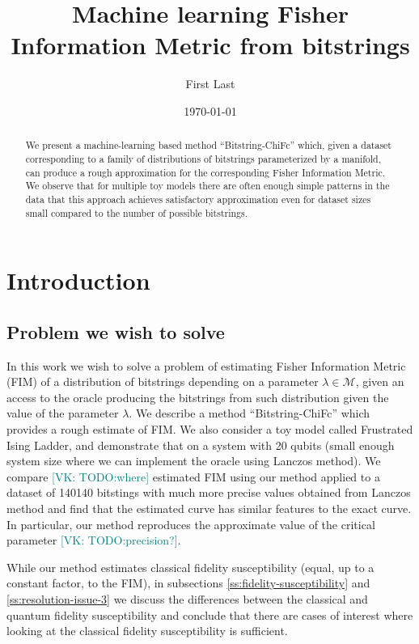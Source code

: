 \documentclass[
  american,aps,pra,reprint,floatfix,nofootinbib,superscriptaddress
]{revtex4-2}
\newcommand{\VK}[1]{\textcolor{teal}{[VK: #1]}}
\begin{document}
\title{Machine learning Fisher Information Metric from bitstrings}
\author{First Last}

\date{\today}

\begin{abstract}
We present a machine-learning based method ``Bitstring-ChiFc'' which,
given a dataset corresponding to a family of distributions of bitstrings
parameterized by a manifold, can produce a rough approximation
for the corresponding Fisher Information Metric.
We observe that for multiple toy models there are often enough simple patterns
in the data that this approach
achieves satisfactory approximation even for dataset sizes small
compared to the number of possible bitstrings.
\end{abstract}

\maketitle

\section{Introduction}
\subsection{Problem we wish to solve}
In this work we wish to solve a problem of estimating Fisher Information Metric
(FIM) of a distribution of bitstrings depending on a parameter
$\lambda \in \mathcal{M}$, given an access to the oracle producing the
bitstrings from such distribution given the value of the parameter $\lambda$.
We describe a method ``Bitstring-ChiFc'' which provides a rough estimate of FIM.
We also consider a toy model called Frustrated Ising Ladder, and demonstrate
that on a system with 20 qubits (small enough system size where we can
implement the oracle using Lanczos method).
We compare \VK{TODO:where} estimated FIM using our method applied to a dataset
of 140140 bitstings with much more precise values obtained from
Lanczos method and find that the estimated curve has similar features
to the exact curve. In particular, our method reproduces the approximate value
of the critical parameter \VK{TODO:precision?}.

While our method estimates classical fidelity susceptibility (equal, up to
a constant factor, to the FIM), in subsections
\ref{ss:fidelity-susceptibility} and \ref{ss:resolution-issue-3}
we discuss the differences between the classical and quantum fidelity
susceptibility and conclude that there are cases of interest
where looking at the classical fidelity susceptibility is sufficient.
\end{document}
